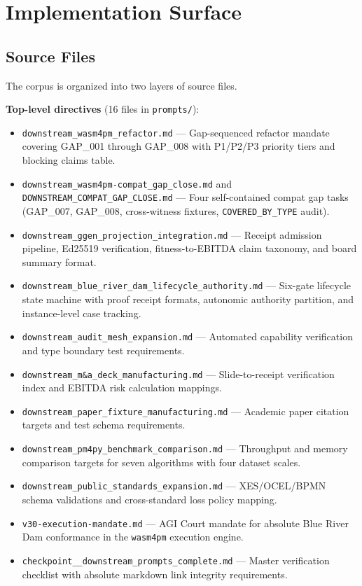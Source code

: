 
\section{Implementation Surface}
\label{sec:prompts-implementation}

\subsection{Source Files}
\label{sec:prompts-implementation-sources}

The corpus is organized into two layers of source files.

\textbf{Top-level directives} (16 files in \texttt{prompts/}):
\begin{itemize}
  \item \texttt{downstream\_wasm4pm\_refactor.md} --- Gap-sequenced refactor mandate
    covering GAP\_001 through GAP\_008 with P1/P2/P3 priority tiers and blocking
    claims table.
  \item \texttt{downstream\_wasm4pm-compat\_gap\_close.md} and
    \texttt{DOWNSTREAM\_COMPAT\_GAP\_CLOSE.md} --- Four self-contained compat gap
    tasks (GAP\_007, GAP\_008, cross-witness fixtures, \texttt{COVERED\_BY\_TYPE}
    audit).
  \item \texttt{downstream\_ggen\_projection\_integration.md} --- Receipt admission
    pipeline, Ed25519 verification, fitness-to-EBITDA claim taxonomy, and board
    summary format.
  \item \texttt{downstream\_blue\_river\_dam\_lifecycle\_authority.md} --- Six-gate
    lifecycle state machine with proof receipt formats, autonomic authority partition,
    and instance-level case tracking.
  \item \texttt{downstream\_audit\_mesh\_expansion.md} --- Automated capability
    verification and type boundary test requirements.
  \item \texttt{downstream\_m\&a\_deck\_manufacturing.md} --- Slide-to-receipt
    verification index and EBITDA risk calculation mappings.
  \item \texttt{downstream\_paper\_fixture\_manufacturing.md} --- Academic paper
    citation targets and test schema requirements.
  \item \texttt{downstream\_pm4py\_benchmark\_comparison.md} --- Throughput and
    memory comparison targets for seven algorithms with four dataset scales.
  \item \texttt{downstream\_public\_standards\_expansion.md} --- XES/OCEL/BPMN
    schema validations and cross-standard loss policy mapping.
  \item \texttt{v30-execution-mandate.md} --- AGI Court mandate for absolute Blue
    River Dam conformance in the \texttt{wasm4pm} execution engine.
  \item \texttt{checkpoint\_\_downstream\_prompts\_complete.md} --- Master
    verification checklist with absolute markdown link integrity requirements.
\end{itemize}


